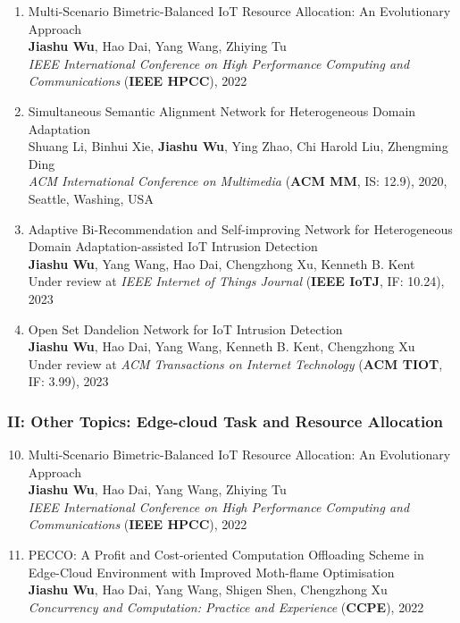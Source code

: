 \documentclass[letterpaper,11pt]{article}
\begin{document}
\begin{enumerate}
  \item Multi-Scenario Bimetric-Balanced IoT Resource Allocation: An Evolutionary Approach\\
  \textbf{Jiashu Wu}, Hao Dai, Yang Wang\textsuperscript{\Letter}, Zhiying Tu\\
  \textit{IEEE International Conference on High Performance Computing and Communications} (\textbf{IEEE HPCC}), 2022

  \item Simultaneous Semantic Alignment Network for Heterogeneous Domain Adaptation\\
  Shuang Li, Binhui Xie, \textbf{Jiashu Wu}, Ying Zhao, Chi Harold Liu\textsuperscript{\Letter}, Zhengming Ding\\
  \textit{ACM International Conference on Multimedia} (\textbf{ACM MM}, IS: 12.9), 2020, Seattle, Washing, USA

  \item Adaptive Bi-Recommendation and Self-improving Network for Heterogeneous Domain Adaptation-assisted IoT Intrusion Detection\\
  \textbf{Jiashu Wu}, Yang Wang\textsuperscript{\Letter}, Hao Dai, Chengzhong Xu, Kenneth B. Kent\\
  Under review at \textit{IEEE Internet of Things Journal} (\textbf{IEEE IoTJ}, IF: 10.24), 2023

  \item Open Set Dandelion Network for IoT Intrusion Detection\\
  \textbf{Jiashu Wu}, Hao Dai, Yang Wang\textsuperscript{\Letter}, Kenneth B. Kent, Chengzhong Xu\\
  Under review at \textit{ACM Transactions on Internet Technology} (\textbf{ACM TIOT}, IF: 3.99), 2023
\end{enumerate}

\iffalse
\subsubsection*{II: Other Topics: Edge-cloud Task and Resource Allocation}
\begin{enumerate}
  \setcounter{enumi}{9}
  \item Multi-Scenario Bimetric-Balanced IoT Resource Allocation: An Evolutionary Approach\\
  \textbf{Jiashu Wu}, Hao Dai, Yang Wang\textsuperscript{\Letter}, Zhiying Tu\\
  \textit{IEEE International Conference on High Performance Computing and Communications} (\textbf{IEEE HPCC}), 2022

  \item PECCO: A Profit and Cost-oriented Computation Offloading Scheme in Edge-Cloud Environment with Improved Moth-flame Optimisation\\
  \textbf{Jiashu Wu}, Hao Dai, Yang Wang\textsuperscript{\Letter}, Shigen Shen, Chengzhong Xu\\
  \textit{Concurrency and Computation: Practice and Experience} (\textbf{CCPE}), 2022
\end{enumerate}
\end{document}
